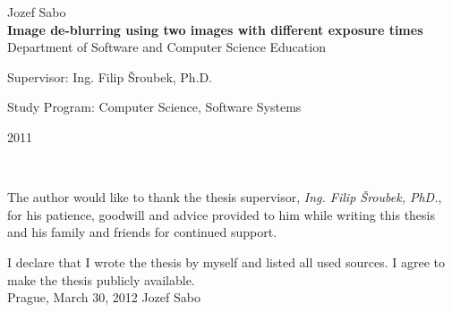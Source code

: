 \documentclass[12pt,notitlepage]{report}
\begin{document}
\begin{titlepage}
\begin{center}
\vspace{15mm}

{\Large Jozef Sabo}\\ %
\vspace{5mm}
{\Large\bf Image de-blurring using two images with different exposure times}\\
\vspace{5mm}
Department of Software and Computer Science Education\\ %
\end{center}
\vspace{17mm}

\begin{center}
\large
\noindent Supervisor: Ing. Filip Šroubek, Ph.D.
\vspace{1mm}

\noindent Study Program: Computer Science, Software Systems
\end{center}

\vspace{8mm}


\begin{center}
2011 %
\end{center}

\end{titlepage} %
\pagestyle{plain}
\normalsize %
\setcounter{page}{2} %
\ \vspace{10mm}

\noindent The author would like to thank the thesis supervisor, {\em Ing. Filip Šroubek, PhD.}, for his patience, goodwill and advice provided to him while writing this thesis and his family and friends for continued support.

\vspace{\fill} %
\noindent I declare that I wrote the thesis by myself and listed all used sources. I agree to make the thesis publicly available. \\[2cm]

\noindent Prague, March 30, 2012 \hspace{\fill}Jozef Sabo\\ %

\end{document}
